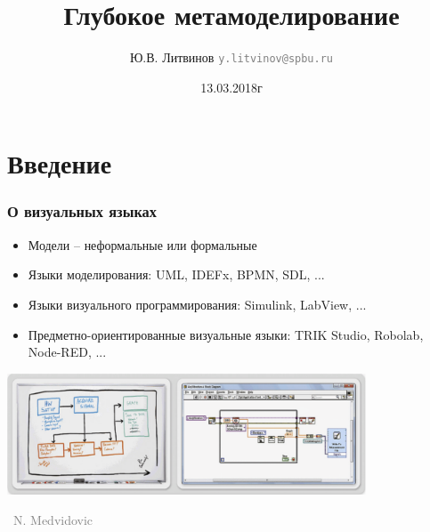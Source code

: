 \documentclass[xetex,mathserif,serif]{beamer}
\title{Глубокое метамоделирование}
\author[Юрий Литвинов]{Ю.В. Литвинов \newline 
	\textcolor{gray}{\small\texttt{y.litvinov@spbu.ru}}
}
\date{13.03.2018г}
\newcommand{\attribution}[1] {
\vspace{-5mm}\begin{flushright}\begin{scriptsize}\textcolor{gray}{\textcopyright\, #1}\end{scriptsize}\end{flushright}
}
\begin{document}
	\frame{\titlepage}

	\section{Введение}

	\begin{frame}
		\frametitle{О визуальных языках}
		\begin{itemize}
			\item Модели -- неформальные или формальные
			\item Языки моделирования: UML, IDEFx, BPMN, SDL, ...
			\item Языки визуального программирования: Simulink, LabView, ...
			\item Предметно-ориентированные визуальные языки: TRIK Studio, Robolab, Node-RED, ...
		\end{itemize}
		\begin{center}
			\includegraphics[width=0.8\textwidth]{sketchesVsFormalNotations.png}
			\attribution{N. Medvidovic}
		\end{center}
	\end{frame}
\end{document}
